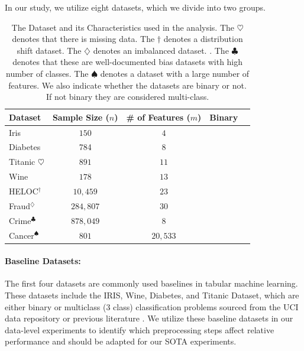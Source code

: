 \documentclass{article}
\newcommand{\cmark}{\ding{51}}%
\newcommand{\xmark}{\ding{55}}%
\theoremstyle{plain}
\theoremstyle{definition}
\theoremstyle{remark}
\begin{document}
In our study, we utilize eight datasets, which we divide into two groups. 

\begin{table}[h!]
  \small %
  \centering
  \caption{The Dataset and its Characteristics used in the analysis. The $\heartsuit$ denotes that there is missing data. The $\dagger$ denotes a distribution shift dataset. The $\diamondsuit$ denotes an imbalanced dataset. \cite{gardner2023tableshift}. The $\clubsuit$ denotes that these are well-documented bias datasets with high number of classes.  The $\spadesuit$ denotes a dataset with a large number of features. We also indicate whether the datasets are binary or not. If not binary they are considered multi-class.}
  
  \begin{adjustbox}{width=\columnwidth}
  \begin{tabular}{lcccc}
    \hline
    \textbf{Dataset} & \textbf{Sample Size ($n$)} & \textbf{\# of Features ($m$)} & \textbf{Binary} \\
    \hline
    Iris   & $150$ & $4 $ & \xmark       \\
    Diabetes & 784 & 8 & \cmark\\
    Titanic $\heartsuit$ & $891$ & $11$&  \cmark          \\
    Wine    & $178$ & $13$  &  \xmark      \\
    HELOC$^\dagger$ & $10,459$  & $23$ & \cmark   
    \\
        Fraud$^{\diamondsuit}$    & $284,807$ & $30$  &\cmark       \\
    Crime$^\clubsuit$    & $878,049$ & $8$ &   \xmark      \\
    Cancer$^\spadesuit$ & $801$ & $20,533$ & \xmark\\
    \hline
  \end{tabular}
  \end{adjustbox}
  \label{charact}
\end{table}

\paragraph{Baseline Datasets:} The first four datasets are commonly used baselines in tabular machine learning. These datasets include the IRIS, Wine, Diabetes, and Titanic Dataset, which are either binary or multiclass (3 class) classification problems sourced from the UCI data repository or previous literature \citep{asuncion2007uci, smith1988using}. We utilize these baseline datasets in our data-level experiments to identify which preprocessing steps affect relative performance and should be adapted for our SOTA experiments.
\end{document}
